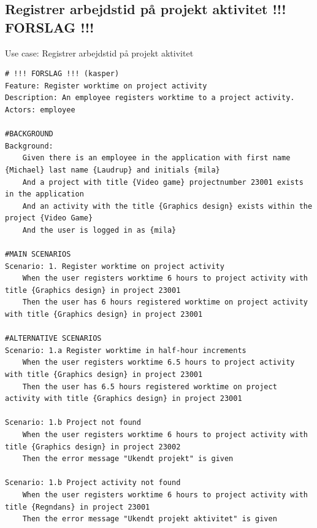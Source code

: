 \subsection{Registrer arbejdstid på projekt aktivitet !!! FORSLAG !!!}
\begin{listing}[H]
    \centering
    \caption{Use case: Registrer arbejdstid på projekt aktivitet} \label{lst:usecase_register_worktime_projectactivity}
    \begin{verbatim}  
# !!! FORSLAG !!! (kasper)
Feature: Register worktime on project activity
Description: An employee registers worktime to a project activity.
Actors: employee

#BACKGROUND
Background:
    Given there is an employee in the application with first name {Michael} last name {Laudrup} and initials {mila}
    And a project with title {Video game} projectnumber 23001 exists in the application
    And an activity with the title {Graphics design} exists within the project {Video Game}
    And the user is logged in as {mila}

#MAIN SCENARIOS
Scenario: 1. Register worktime on project activity
    When the user registers worktime 6 hours to project activity with title {Graphics design} in project 23001
    Then the user has 6 hours registered worktime on project activity with title {Graphics design} in project 23001

#ALTERNATIVE SCENARIOS
Scenario: 1.a Register worktime in half-hour increments
    When the user registers worktime 6.5 hours to project activity with title {Graphics design} in project 23001
    Then the user has 6.5 hours registered worktime on project activity with title {Graphics design} in project 23001

Scenario: 1.b Project not found
    When the user registers worktime 6 hours to project activity with title {Graphics design} in project 23002
    Then the error message "Ukendt projekt" is given 
    
Scenario: 1.b Project activity not found
    When the user registers worktime 6 hours to project activity with title {Regndans} in project 23001
    Then the error message "Ukendt projekt aktivitet" is given 

    \end{verbatim}
\end{listing}

